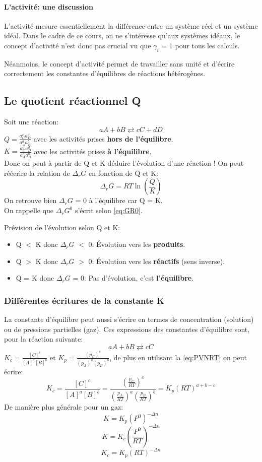 \documentclass[10pt,a4paper]{book}
\begin{document}
\paragraph{L'activité: une discussion} L’activité mesure essentiellement la différence entre un système réel et un système idéal. Dans le cadre de ce cours, on ne s'intéresse qu'aux systèmes idéaux, le concept d’activité n’est donc pas crucial vu que $\gamma_i$ = 1 pour tous les calculs. \par
Néanmoins, le concept d'activité permet de travailler sans unité et d'écrire correctement les constantes d'équilibres de réactions hétérogènes.

\subsection{Le quotient réactionnel Q}
Soit une réaction:
\[aA + bB \rightleftarrows cC + dD\]
\(Q = \frac{a_C^c a_D^d}{a_A^a a_B^b}\) avec les activités prises \textbf{hors de l'équilibre}. \\
\(K = \frac{a_C^c a_D^d}{a_A^a a_B^b}\) avec les activités prises \textbf{à l'équilibre}. \\
Donc on peut à partir de Q et K déduire l'évolution d'une réaction ! On peut réécrire la relation de $\Delta_rG$ en fonction de Q et K: 
\[\Delta_rG = RT\ln(\frac{Q}{K})\]
On retrouve bien $\Delta_rG$ = 0 à l'équilibre car Q = K. \\
On rappelle que $\Delta_rG^0$ s'écrit selon \ref{eq:GR0}. \\ \par
Prévision de l'évolution selon Q et K:
\begin{itemize}
\item Q $<$ K donc $\Delta_rG$ $<$ 0: Évolution vers les \textbf{produits}.
\item Q $>$ K donc $\Delta_rG$ $>$ 0: Évolution vers les \textbf{réactifs} (sens inverse).
\item Q = K donc $\Delta_rG$ = 0: Pas d'évolution, c'est \textbf{l'équilibre}.
\end{itemize}

\subsubsection{Différentes écritures de la constante K}

La constante d’équilibre peut aussi s’écrire en termes de concentration (solution) ou de
pressions partielles (gaz). Ces expressions des constantes d’équilibre sont, pour la réaction suivante: 
\[aA + bB \rightleftarrows cC\]
\(K_c = \frac{[C]^c}{[A]^a[B]^b}\) et \(K_p = \frac{(p_C)^c}{(p_A)^a(p_B)^b}\), de plus en utilisant la \ref{eq:PVNRT} on peut écrire:
\[K_c = \frac{[C]^c}{[A]^a[B]^b} = \frac{(\frac{p_C}{RT})^c}{(\frac{p_A}{RT})^a(\frac{p_B}{RT})^b} = K_p(RT)^{a+b-c}\]
De manière plus générale pour un gaz:
\[K = K_p(P^0)^{-\Delta n}\]
\[K = K_c(\frac{P^0}{RT})^{-\Delta n}\]
\[K_c = K_p(RT)^{-\Delta n}\]
\end{document}
